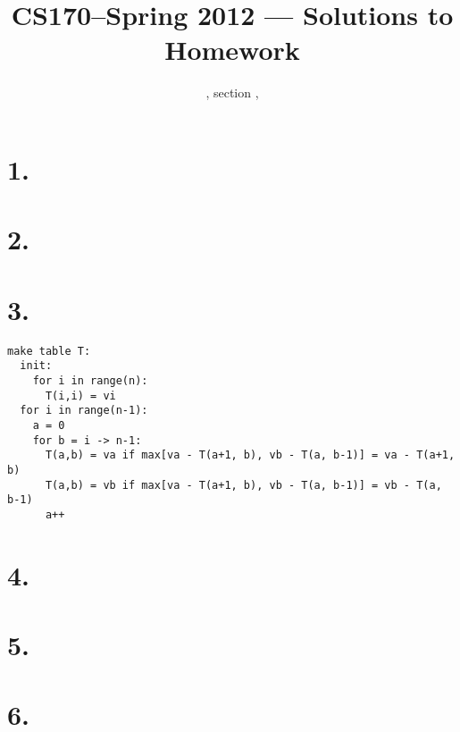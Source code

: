 \documentclass[11pt]{article}
\title{CS170--Spring 2012 --- Solutions to Homework \HW}
\author{\Name, section \Sec, \texttt{\Login}}
\begin{document}
\maketitle

\section*{1.}
\newpage
\section*{2.}
\newpage
\section*{3.}
\begin{verbatim}
make table T:
  init: 
    for i in range(n):
      T(i,i) = vi
  for i in range(n-1):
    a = 0
    for b = i -> n-1:
      T(a,b) = va if max[va - T(a+1, b), vb - T(a, b-1)] = va - T(a+1, b)
      T(a,b) = vb if max[va - T(a+1, b), vb - T(a, b-1)] = vb - T(a, b-1)
      a++
\end{verbatim}
\newpage
\section*{4.}
\newpage
\section*{5.}
\newpage
\section*{6.}
\end{document}

